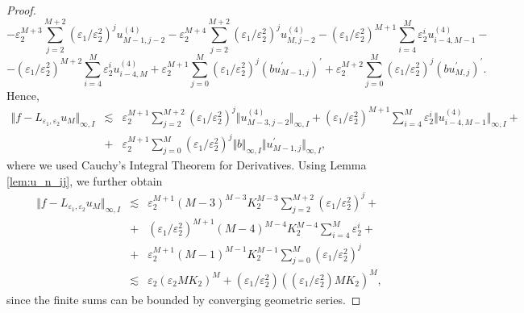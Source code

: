 \documentclass[12pt]{article}
\begin{document}
\begin{proof}
\[\]%
\[
- \varepsilon_2^{M+3} \sum_{j=2}^{M+2} (\varepsilon_1 / \varepsilon_2^2)^j u_{M-1,j-2}^{(4)} - \varepsilon_2^{M+4} \sum_{j=2}^{M+2} (\varepsilon_1 / \varepsilon_2^2)^j u_{M,j-2}^{(4)} - (\varepsilon_1 / \varepsilon_2^2)^{M+1} \sum_{i=4}^M \varepsilon_2^i u_{i-4,M-1}^{(4)} -
\]%
\[
- (\varepsilon_1 / \varepsilon_2^2)^{M+2} \sum_{i=4}^M \varepsilon_2^i u_{i-4,M}^{(4)} + \varepsilon_2^{M+1} \sum_{j=0}^M (\varepsilon_1 / \varepsilon_2^2)^j \left( b u_{M-1,j}^{\prime } \right) ^{\prime } + \varepsilon_2^{M+2} \sum_{j=0}^M (\varepsilon_1 / \varepsilon_2^2)^j \left( b u_{M,j}^{\prime } \right) ^{\prime }.
\]%
Hence,
%
\begin{eqnarray*}
\Vert f - L_{\varepsilon_1, \varepsilon_2} u_M \Vert _{\infty ,I} &\lesssim& \varepsilon_2^{M+1} \sum_{j=2}^{M+2} (\varepsilon_1 / \varepsilon_2^2)^j \Vert u_{M-3,j-2}^{(4)} \Vert _{\infty ,I} + (\varepsilon_1 / \varepsilon_2^2)^{M+1} \sum_{i=4}^M \varepsilon_2^i \Vert u_{i-4,M-1}^{(4)} \Vert _{\infty ,I} + \\
&+& \varepsilon_2^{M+1} \sum_{j=0}^M (\varepsilon_1 / \varepsilon_2^2)^j \Vert b \Vert _{\infty ,I} \Vert u_{M-1,j}^{\prime } \Vert _{\infty ,I},
\end{eqnarray*}
%
where we used Cauchy's Integral Theorem for Derivatives. Using Lemma \ref{lem:u_n_ij}, we further obtain
%
\begin{eqnarray*}
\Vert f - L_{\varepsilon_1, \varepsilon_2} u_M \Vert _{\infty ,I} &\lesssim& \varepsilon_2^{M+1} (M-3)^{M-3} K_2^{M-3} \sum_{j=2}^{M+2} (\varepsilon_1 / \varepsilon_2^2)^j +  \\
&+& (\varepsilon_1 / \varepsilon_2^2)^{M+1} (M-4)^{M-4} K_2^{M-4} \sum_{i=4}^M \varepsilon_2^i + \\
&+& \varepsilon_2^{M+1} (M-1)^{M-1} K_2^{M-1} \sum_{j=0}^M (\varepsilon_1 / \varepsilon_2^2)^j \\
&\lesssim& \varepsilon_2 (\varepsilon_2 M K_2)^M + (\varepsilon_1 / \varepsilon_2^2) \left( (\varepsilon_1 / \varepsilon_2^2) M K_2 \right) ^M,
\end{eqnarray*}
%
since the finite sums can be bounded by converging geometric series.


\end{proof}
\end{document}
